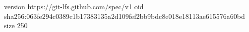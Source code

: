 version https://git-lfs.github.com/spec/v1
oid sha256:063fe294c0389c1b17383135a2d109fef2bb9bdc8e018e18113ae615576a60bd
size 250
